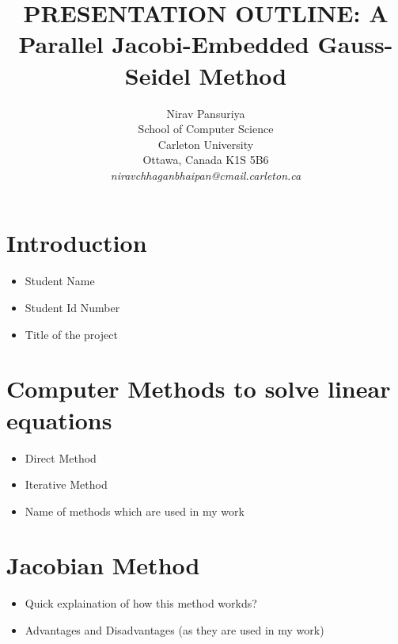 \documentclass[11pt]{article}       %
\newenvironment{slide}[1]        {\section{#1} \begin{itemize}}%
                                 {\end{itemize}}
\begin{document}

\newcommand{\SubItem}[1]{
    {\setlength\itemindent{15pt} \item[-] #1}
}
\title{PRESENTATION OUTLINE: A Parallel Jacobi-Embedded Gauss-Seidel Method}


\author{
Nirav Pansuriya\\
School of Computer Science\\
Carleton University\\
Ottawa, Canada K1S 5B6\\
{\em niravchhaganbhaipan@cmail.carleton.ca}
} %

\maketitle

\begin{slide}{Introduction}
\item Student Name
\item Student Id Number
\item Title of the project
\end{slide}


\begin{slide}{Computer Methods to solve linear equations}
\item Direct Method
\item Iterative Method
\item Name of methods which are used in my work
\end{slide}

\begin{slide}{Jacobian Method}
\item Quick explaination of how this method workds?
\item Advantages and Disadvantages (as they are used in my work)
\end{slide}
\end{document}
